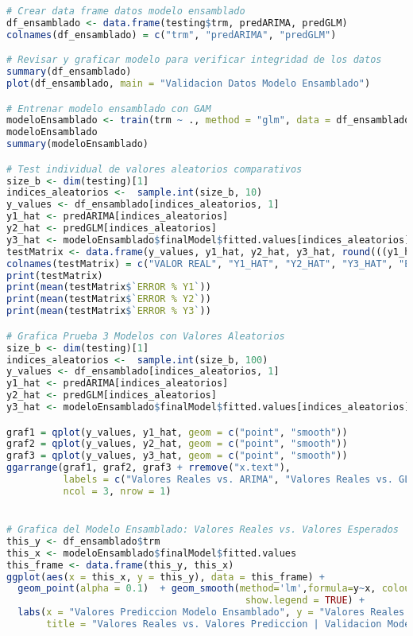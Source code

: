 \begin{lstlisting}[language=R]
# Crear data frame datos modelo ensamblado
df_ensamblado <- data.frame(testing$trm, predARIMA, predGLM)
colnames(df_ensamblado) = c("trm", "predARIMA", "predGLM")

# Revisar y graficar modelo para verificar integridad de los datos
summary(df_ensamblado)
plot(df_ensamblado, main = "Validacion Datos Modelo Ensamblado")

# Entrenar modelo ensamblado con GAM
modeloEnsamblado <- train(trm ~ ., method = "glm", data = df_ensamblado)
modeloEnsamblado
summary(modeloEnsamblado)

# Test individual de valores aleatorios comparativos
size_b <- dim(testing)[1]
indices_aleatorios <-  sample.int(size_b, 10)
y_values <- df_ensamblado[indices_aleatorios, 1]
y1_hat <- predARIMA[indices_aleatorios]
y2_hat <- predGLM[indices_aleatorios]
y3_hat <- modeloEnsamblado$finalModel$fitted.values[indices_aleatorios]
testMatrix <- data.frame(y_values, y1_hat, y2_hat, y3_hat, round(((y1_hat/y_values)-1)*100,1), round(((y2_hat/y_values)-1)*100,1), round(((y3_hat/y_values)-1)*100,1))
colnames(testMatrix) = c("VALOR REAL", "Y1_HAT", "Y2_HAT", "Y3_HAT", "ERROR % Y1", "ERROR % Y2", "ERROR % Y3")
print(testMatrix)
print(mean(testMatrix$`ERROR % Y1`))
print(mean(testMatrix$`ERROR % Y2`))
print(mean(testMatrix$`ERROR % Y3`))

# Grafica Prueba 3 Modelos con Valores Aleatorios
size_b <- dim(testing)[1]
indices_aleatorios <-  sample.int(size_b, 100)
y_values <- df_ensamblado[indices_aleatorios, 1]
y1_hat <- predARIMA[indices_aleatorios]
y2_hat <- predGLM[indices_aleatorios]
y3_hat <- modeloEnsamblado$finalModel$fitted.values[indices_aleatorios]

graf1 = qplot(y_values, y1_hat, geom = c("point", "smooth"))
graf2 = qplot(y_values, y2_hat, geom = c("point", "smooth"))
graf3 = qplot(y_values, y3_hat, geom = c("point", "smooth"))
ggarrange(graf1, graf2, graf3 + rremove("x.text"),
          labels = c("Valores Reales vs. ARIMA", "Valores Reales vs. GLM", "Valores Reales vs. STACKING"),
          ncol = 3, nrow = 1)


# Grafica del Modelo Ensamblado: Valores Reales vs. Valores Esperados
this_y <- df_ensamblado$trm
this_x <- modeloEnsamblado$finalModel$fitted.values
this_frame <- data.frame(this_y, this_x)
ggplot(aes(x = this_x, y = this_y), data = this_frame) +
  geom_point(alpha = 0.1)  + geom_smooth(method='lm',formula=y~x, colour = "orange",
                                          show.legend = TRUE) +
  labs(x = "Valores Prediccion Modelo Ensamblado", y = "Valores Reales TRM",
       title = "Valores Reales vs. Valores Prediccion | Validacion Modelo Ensamblado")


\end{lstlisting}
